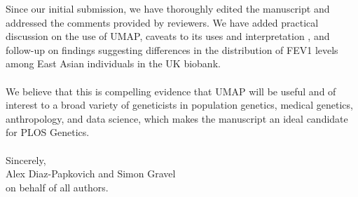 \documentclass{article}
\begin{document}
Since our initial submission, we have thoroughly edited the manuscript and addressed the comments provided by reviewers. We have added practical discussion on the use of UMAP, caveats to its uses and interpretation , and follow-up on findings suggesting differences in the distribution of FEV1 levels among East Asian individuals in the UK biobank.
\\\\
We believe that this is compelling evidence that UMAP will be useful and of interest to a broad variety of geneticists in population genetics, medical genetics, anthropology, and data science, which makes the manuscript an ideal candidate for PLOS Genetics.
\\
\\
Sincerely,
\\
Alex Diaz-Papkovich and Simon Gravel
\\
on behalf of all authors.
\end{document}
